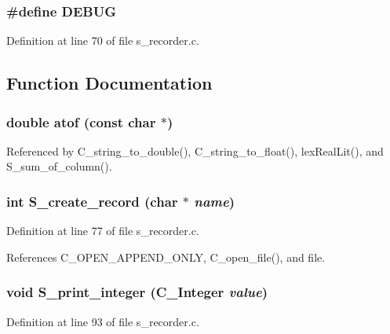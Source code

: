 \subsubsection{\setlength{\rightskip}{0pt plus 5cm}\#define DEBUG}\label{s__recorder_8c_d72dbcf6d0153db1b8d8a58001feed83}




Definition at line 70 of file s\_\-recorder.c.

\subsection{Function Documentation}
\subsubsection{\setlength{\rightskip}{0pt plus 5cm}double atof (const char $\ast$)}\label{s__recorder_8c_3c03a473fd58b46d02952cbb6f4a83af}




Referenced by C\_\-string\_\-to\_\-double(), C\_\-string\_\-to\_\-float(), lex\-Real\-Lit(), and S\_\-sum\_\-of\_\-column().
\subsubsection{\setlength{\rightskip}{0pt plus 5cm}int S\_\-create\_\-record (char $\ast$ {\em name})}\label{s__recorder_8c_c0aba05c13eae6d70f489c223d2f487c}




Definition at line 77 of file s\_\-recorder.c.

References C\_\-OPEN\_\-APPEND\_\-ONLY, C\_\-open\_\-file(), and file.
\subsubsection{\setlength{\rightskip}{0pt plus 5cm}void S\_\-print\_\-integer (\bf{C\_\-Integer} {\em value})}\label{s__recorder_8c_fae80fc71a6c1ed9ef528caf488d7eaf}




Definition at line 93 of file s\_\-recorder.c.

